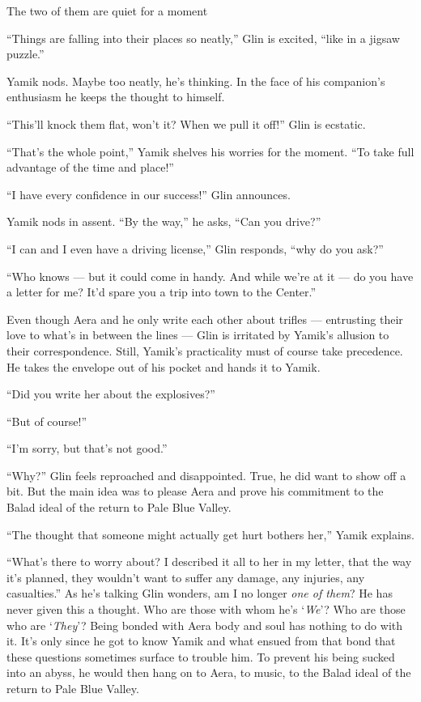 \documentclass[twoside,11pt]{book}
\begin{document}
The two of them are quiet for a moment

``Things are falling into their places so neatly,'' Glin is excited, ``like in a
jigsaw puzzle.''

Yamik nods. Maybe too neatly, he's thinking. In the face of his companion's enthusiasm he keeps the thought to himself.

{}``This'll knock them flat, won't it? When we pull it off!'' Glin is ecstatic.

``That's the whole point,'' Yamik shelves his worries for the moment. ``To take
full advantage of the time and place!''

``I have every confidence in our success!'' Glin announces.

Yamik nods in assent. ``By the way,'' he asks, ``Can you drive?''

``I can and I even have a driving license,'' Glin responds, ``why do you
ask?''

``Who knows --- but it could come in handy. And while we're at it --- do you have a letter for me? It'd spare you a
trip into town to the Center.''

Even though Aera and he only write each other about trifles --- entrusting their love to what's in between the lines ---
Glin is irritated by Yamik's allusion to their correspondence. Still, Yamik's practicality must of course take
precedence.  He takes the envelope out of his pocket and hands it to Yamik.

``Did you write her about the explosives?''

``But of course!''

``I'm sorry, but that's not good.''

``Why?'' Glin feels reproached and disappointed. True, he did want to show off a bit. But the
main idea was to please Aera and prove his commitment to the Balad ideal of the return to Pale Blue Valley.

``The thought that someone might actually get hurt bothers her,'' Yamik explains.

``What's there to worry about? I described it all to her in my letter, that the way it's planned,
they   wouldn't want to suffer any damage, any injuries, any casualties.'' As he's talking Glin
wonders, am I no longer \textit{one of them}? He has never given this a
thought. Who are those with whom he's `\textit{We}{}'? Who are those who are `\textit{They}'? Being bonded with Aera
body and soul has nothing to do with it. It's only since he got to know Yamik and what ensued from that
bond that these questions sometimes surface to trouble him. To prevent his being sucked into an abyss, he
would then hang on to Aera, to music, to the Balad ideal of the return to Pale Blue Valley.
\end{document}
